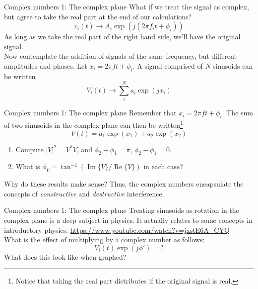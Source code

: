 \documentclass{beamer}
\begin{document}
\begin{frame}{Complex numbers 1: The complex plane}
What if we treat the signal as complex, but agree to take the real part at the end of our calculations?
\begin{equation}
v_i(t) \rightarrow A_i \exp(j(2\pi f_i t + \phi_i))
\end{equation}
As long as we take the real part of the right hand side, we'll have the original signal. \\ \vspace{0.5cm}
Now contemplate the addition of signals of the same frequency, but different amplitudes and phases.  Let $x_i = 2\pi ft+\phi_i$.  A signal comprised of $N$ sinusoids can be written
\begin{equation}
V_i(t) \rightarrow \sum_i^N a_i \exp(jx_i)
\end{equation}
\end{frame}

\begin{frame}{Complex numbers 1: The complex plane}
Remember that $x_i = 2\pi ft+\phi_i$.  The sum of two sinusoids in the complex plane can then be written\footnote{Notice that taking the real part distributes if the original signal is real.}
\begin{equation}
V(t) = a_1\exp(x_1) + a_2\exp(x_2)
\end{equation}
\begin{enumerate}
\item Compute $|V|^2 = V^*V$, and $\phi_2 - \phi_1 = \pi$, $\phi_2 - \phi_1 = 0$.
\item What is $\phi_V = \tan^{-1}(\operatorname{Im}\lbrace V \rbrace/\operatorname{Re}\lbrace V \rbrace)$ in each case?
\end{enumerate}
Why do these results make sense?  Thus, the complex numbers encapsulate the concepts of \textit{constructive} and \textit{destructive} interference.
\end{frame}

\begin{frame}{Complex numbers 1: The complex plane}
Treating sinusoids as rotation in the complex plane is a deep subject in physics.  It actually relates to some concepts in introductory physics: \url{https://www.youtube.com/watch?v=jxstE6A_CYQ} \\ \vspace{0.5cm}
What is the effect of multiplying by a complex number as follows:
\begin{equation}
V_i(t) \exp(j\phi') = ?
\end{equation}
What does this look like when graphed?
\end{frame}
\end{document}
